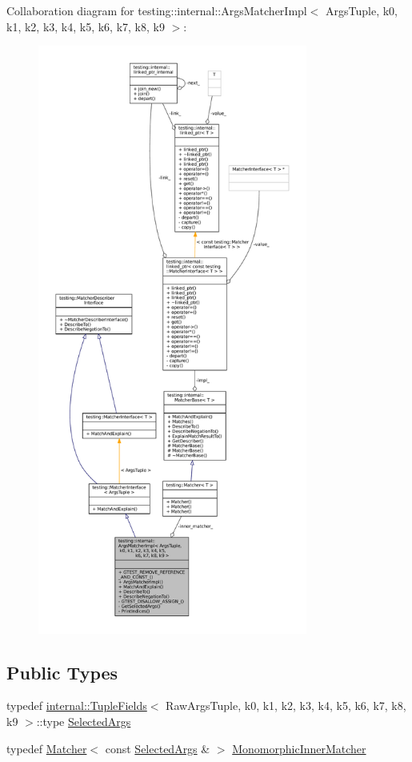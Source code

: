 Collaboration diagram for testing\+:\+:internal\+:\+:Args\+Matcher\+Impl$<$ Args\+Tuple, k0, k1, k2, k3, k4, k5, k6, k7, k8, k9 $>$\+:
\nopagebreak
\begin{figure}[H]
\begin{center}
\leavevmode
\includegraphics[height=550pt]{classtesting_1_1internal_1_1ArgsMatcherImpl__coll__graph}
\end{center}
\end{figure}
\subsection*{Public Types}
\begin{DoxyCompactItemize}
\item 
typedef \hyperlink{classtesting_1_1internal_1_1TupleFields}{internal\+::\+Tuple\+Fields}$<$ Raw\+Args\+Tuple, k0, k1, k2, k3, k4, k5, k6, k7, k8, k9 $>$\+::type \hyperlink{classtesting_1_1internal_1_1ArgsMatcherImpl_ab061679f6251e56ccbedaf0c316d00ff}{Selected\+Args}
\item 
typedef \hyperlink{classtesting_1_1Matcher}{Matcher}$<$ const \hyperlink{classtesting_1_1internal_1_1ArgsMatcherImpl_ab061679f6251e56ccbedaf0c316d00ff}{Selected\+Args} \& $>$ \hyperlink{classtesting_1_1internal_1_1ArgsMatcherImpl_ab90d2c074b2072d6c39bf26209fb941f}{Monomorphic\+Inner\+Matcher}
\end{DoxyCompactItemize}
